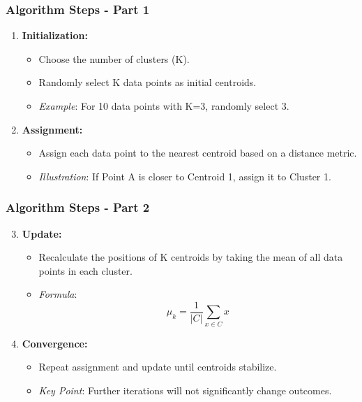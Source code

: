 \documentclass[aspectratio=169]{beamer}
\begin{document}
\begin{frame}[fragile]
    \frametitle{Algorithm Steps - Part 1}
    \begin{enumerate}
        \item \textbf{Initialization:}
        \begin{itemize}
            \item Choose the number of clusters (K).
            \item Randomly select K data points as initial centroids.
            \item \textit{Example}: For 10 data points with K=3, randomly select 3.
        \end{itemize}
        
        \item \textbf{Assignment:}
        \begin{itemize}
            \item Assign each data point to the nearest centroid based on a distance metric.
            \item \textit{Illustration}: If Point A is closer to Centroid 1, assign it to Cluster 1.
        \end{itemize}
    \end{enumerate}
\end{frame}

\begin{frame}[fragile]
    \frametitle{Algorithm Steps - Part 2}
    \begin{enumerate}
        \setcounter{enumi}{2} %
        \item \textbf{Update:}
        \begin{itemize}
            \item Recalculate the positions of K centroids by taking the mean of all data points in each cluster.
            \item \textit{Formula}:
            \begin{equation}
                \mu_k = \frac{1}{|C|} \sum_{x \in C} x
            \end{equation}
        \end{itemize}

        \item \textbf{Convergence:}
        \begin{itemize}
            \item Repeat assignment and update until centroids stabilize.
            \item \textit{Key Point}: Further iterations will not significantly change outcomes.
        \end{itemize}
    \end{enumerate}
\end{frame}
\end{document}
